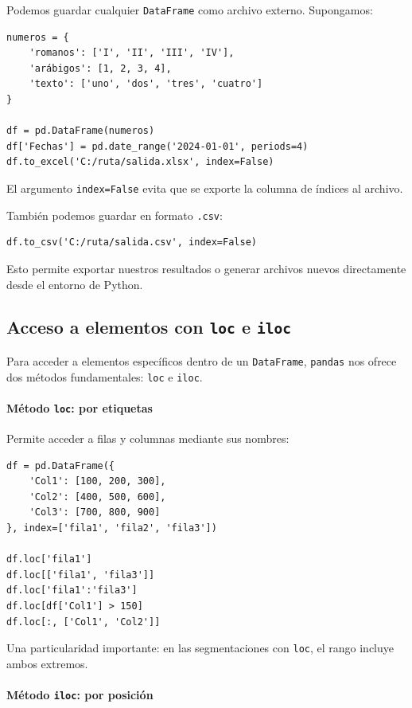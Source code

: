 \documentclass{article}
\theoremstyle{nonumberplain}
\begin{document}
Podemos guardar cualquier \texttt{DataFrame} como archivo externo. Supongamos:

\begin{verbatim}
numeros = {
    'romanos': ['I', 'II', 'III', 'IV'],
    'arábigos': [1, 2, 3, 4],
    'texto': ['uno', 'dos', 'tres', 'cuatro']
}

df = pd.DataFrame(numeros)
df['Fechas'] = pd.date_range('2024-01-01', periods=4)
df.to_excel('C:/ruta/salida.xlsx', index=False)
\end{verbatim}

El argumento \texttt{index=False} evita que se exporte la columna de índices al archivo.

También podemos guardar en formato \texttt{.csv}:

\begin{verbatim}
df.to_csv('C:/ruta/salida.csv', index=False)
\end{verbatim}

Esto permite exportar nuestros resultados o generar archivos nuevos directamente desde el entorno de Python.

\subsection*{Acceso a elementos con \texttt{loc} e \texttt{iloc}}

Para acceder a elementos específicos dentro de un \texttt{DataFrame}, \texttt{pandas} nos ofrece dos métodos fundamentales: \texttt{loc} e \texttt{iloc}.

\paragraph{Método \texttt{loc}: por etiquetas}

Permite acceder a filas y columnas mediante sus nombres:

\begin{verbatim}
df = pd.DataFrame({
    'Col1': [100, 200, 300],
    'Col2': [400, 500, 600],
    'Col3': [700, 800, 900]
}, index=['fila1', 'fila2', 'fila3'])

df.loc['fila1']
df.loc[['fila1', 'fila3']]
df.loc['fila1':'fila3']
df.loc[df['Col1'] > 150]
df.loc[:, ['Col1', 'Col2']]
\end{verbatim}

Una particularidad importante: en las segmentaciones con \texttt{loc}, el rango incluye ambos extremos.

\paragraph{Método \texttt{iloc}: por posición}
\end{document}
